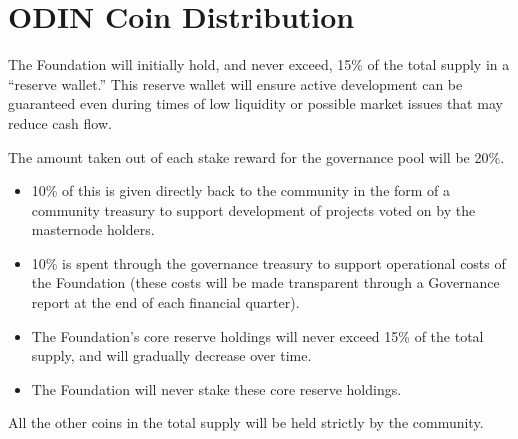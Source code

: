 \section{ODIN Coin Distribution}
The Foundation will initially hold, and never exceed, 15\% of the total supply in a ``reserve wallet.'' This reserve wallet will ensure active development can be guaranteed even during times of low liquidity or possible market issues that may reduce cash flow.

The amount taken out of each stake reward for the governance pool will be 20\%.
\begin{itemize}
   \item 10\% of this is given directly back to the community in the form of a community treasury to support development of projects voted on by the masternode holders.
   \item 10\% is spent through the governance treasury to support operational costs of the Foundation (these costs will be made transparent through a Governance report at the end of each financial quarter).
   \item The Foundation's core reserve holdings will never exceed 15\% of the total supply, and will gradually decrease over time.
   \item The Foundation will never stake these core reserve holdings.
\end{itemize}

All the other coins in the total supply will be held strictly by the community.
\begin{center}
\end{center}

